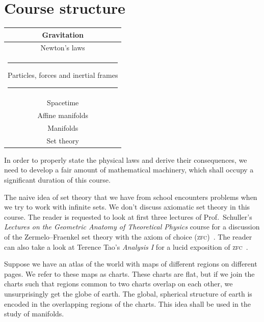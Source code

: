 \documentclass[a4paper, 11pt]{book}
\theoremstyle{definition}
\begin{document}
    \section{Course structure}

    \begin{center}
        \renewcommand{\arraystretch}{1.3}
        \begin{tabular}{|c|}
            \hline
            Gravitation\\
            \hline
            Newton's laws\\
            \hline
            \rule{5pt}{0pt}Particles, forces and inertial frames\rule{5pt}{0pt}\\
            \hline
            Spacetime\\
            \hline
            Affine manifolds\\
            \hline
            Manifolds\\
            \hline
            Set theory\\
            \hline
        \end{tabular}
    \end{center}

    In order to properly state the physical laws and derive their consequences, we need to develop a fair amount of mathematical machinery, which shall occupy a significant duration of this course.

    The naive idea of set theory that we have from school encounters problems when we try to work with infinite sets. We don't discuss axiomatic set theory in this course. The reader is requested to look at first three lectures of Prof.\ Schuller's \textit{Lectures on the Geometric Anatomy of Theoretical Physics} course for a discussion of the Zermelo--Fraenkel set theory with the axiom of choice (\textsc{zfc})~\cite{Schuller_geometric_videos}. The reader can also take a look at Terence Tao's \textit{Analysis I} for a lucid exposition of \textsc{zfc}~\cite{Tao}.

    Suppose we have an atlas of the world with maps of different regions on different pages. We refer to these maps as charts. These charts are flat, but if we join the charts such that regions common to two charts overlap on each other, we unsurprisingly get the globe of earth. The global, spherical structure of earth is encoded in the overlapping regions of the charts. This idea shall be used in the study of manifolds.
\end{document}

